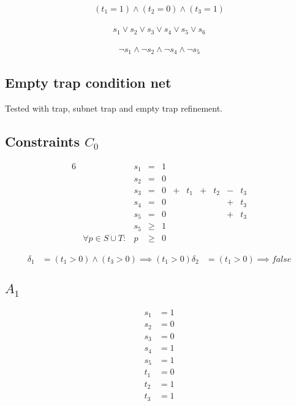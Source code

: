 \documentclass{article}
\begin{document}
\begin{align*}
  (t_1 = 1) \land (t_2 = 0) \land (t_3 = 1)
\end{align*}

\begin{align*}
  s_1 \lor s_2 \lor s_3 \lor s_4 \lor s_5 \lor s_6
\end{align*}

\begin{align*}
  \neg s_1 \land \neg s_2 \land \neg s_4 \land \neg s_5
\end{align*}

\subsection{Empty trap condition net}

Tested with trap, subnet trap and empty trap refinement.

\begin{dot2tex}[dot,options=-tmath]

\end{dot2tex}

\subsection{Constraints $C_0$}

\begin{alignat*}{6}
&& s_1 &{}={}&   1 &     &     &     &     &     &     \\
&& s_2 &{}={}&   0 &     &     &     &     &     &     \\
&& s_3 &{}={}&   0 &{}+{}& t_1 &{}+{}& t_2 &{}-{}& t_3 \\
&& s_4 &{}={}&   0 &     &     &     &     &{}+{}& t_3 \\
&& s_5 &{}={}&   0 &     &     &     &     &{}+{}& t_3 \\
&& s_5 &{}\ge{}& 1 \\
&\forall p \in S \cup T:& p &{}\ge{}& 0
\end{alignat*}

\begin{align*}
  \delta_1 &= (t_1 > 0) \land (t_3 > 0) \implies (t_1 > 0)
  \delta_2 &= (t_1 > 0) \implies false
\end{align*}

\subsection{$A_1$}
\begin{align*}
  s_1 &= 1 \\
  s_2 &= 0 \\
  s_3 &= 0 \\
  s_4 &= 1 \\
  s_5 &= 1 \\
  t_1 &= 0 \\
  t_2 &= 1 \\
  t_3 &= 1
\end{align*}
\end{document}
